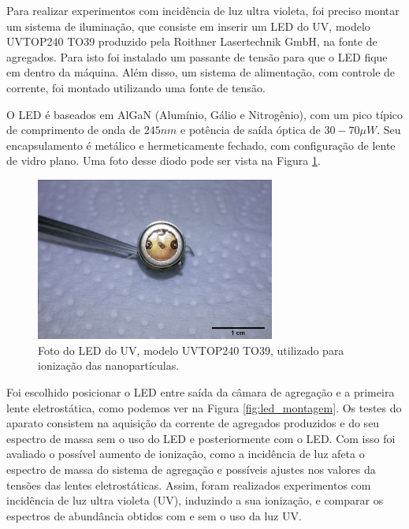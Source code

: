 Para realizar experimentos com incidência de luz ultra violeta, foi preciso montar um sistema de iluminação, que consiste em inserir um LED do UV, modelo UVTOP240 TO39 produzido pela Roithner Lasertechnik GmbH, na fonte de agregados. Para isto foi instalado um passante de tensão para que o LED fique em dentro da máquina. Além disso, um sistema de alimentação, com controle de corrente, foi montado utilizando uma fonte de tensão.

O LED é baseados em AlGaN (Alumínio, Gálio e Nitrogênio), com um pico típico de comprimento de onda de $245 nm$ e potência de saída óptica de $30-70 \mu W$. Seu encapsulamento é metálico e hermeticamente fechado, com configuração de lente de vidro plano. Uma foto desse diodo pode ser vista na Figura \ref{fig:foto_led}.

\begin{figure}
  \centering
  \includegraphics[width=0.7\textwidth]{images/foca/led_scale}
  \caption{ Foto do LED do UV, modelo UVTOP240 TO39, utilizado para ionização das nanopartículas.  }
  \label{fig:foto_led}
\end{figure}


Foi escolhido posicionar o LED entre saída da câmara de agregação e a primeira lente eletrostática, como podemos ver na Figura \ref{fig:led_montagem}. Os testes do aparato consistem na aquisição da corrente de agregados produzidos e do seu espectro de massa sem o uso do LED e posteriormente com o LED. Com isso foi avaliado o possível aumento de ionização, como a incidência de luz afeta o espectro de massa do sistema de agregação e possíveis ajustes nos valores da tensões das lentes eletrostáticas.
Assim, foram realizados experimentos com incidência de luz ultra violeta (UV), induzindo a sua ionização, e comparar os espectros de abundância obtidos com e sem o uso da luz UV. 



